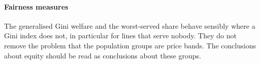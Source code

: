 \paragraph{Fairness measures} The generalised Gini welfare and the worst-served share behave sensibly where a Gini index does not, in particular for lines that serve nobody. They do not remove the problem that the population groups are price bands. The conclusions about equity should be read as conclusions about these groups.


